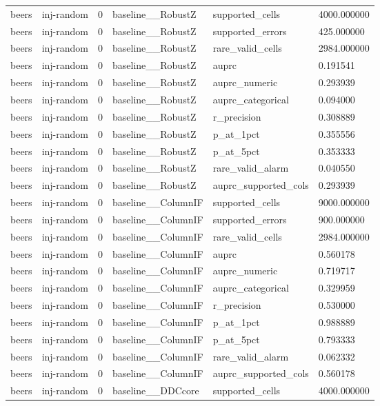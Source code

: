 \begin{tabular}{llllll}
beers & inj-random & 0 & baseline\_\_RobustZ & supported\_cells & 4000.000000 \\
beers & inj-random & 0 & baseline\_\_RobustZ & supported\_errors & 425.000000 \\
beers & inj-random & 0 & baseline\_\_RobustZ & rare\_valid\_cells & 2984.000000 \\
beers & inj-random & 0 & baseline\_\_RobustZ & auprc & 0.191541 \\
beers & inj-random & 0 & baseline\_\_RobustZ & auprc\_numeric & 0.293939 \\
beers & inj-random & 0 & baseline\_\_RobustZ & auprc\_categorical & 0.094000 \\
beers & inj-random & 0 & baseline\_\_RobustZ & r\_precision & 0.308889 \\
beers & inj-random & 0 & baseline\_\_RobustZ & p\_at\_1pct & 0.355556 \\
beers & inj-random & 0 & baseline\_\_RobustZ & p\_at\_5pct & 0.353333 \\
beers & inj-random & 0 & baseline\_\_RobustZ & rare\_valid\_alarm & 0.040550 \\
beers & inj-random & 0 & baseline\_\_RobustZ & auprc\_supported\_cols & 0.293939 \\
beers & inj-random & 0 & baseline\_\_ColumnIF & supported\_cells & 9000.000000 \\
beers & inj-random & 0 & baseline\_\_ColumnIF & supported\_errors & 900.000000 \\
beers & inj-random & 0 & baseline\_\_ColumnIF & rare\_valid\_cells & 2984.000000 \\
beers & inj-random & 0 & baseline\_\_ColumnIF & auprc & 0.560178 \\
beers & inj-random & 0 & baseline\_\_ColumnIF & auprc\_numeric & 0.719717 \\
beers & inj-random & 0 & baseline\_\_ColumnIF & auprc\_categorical & 0.329959 \\
beers & inj-random & 0 & baseline\_\_ColumnIF & r\_precision & 0.530000 \\
beers & inj-random & 0 & baseline\_\_ColumnIF & p\_at\_1pct & 0.988889 \\
beers & inj-random & 0 & baseline\_\_ColumnIF & p\_at\_5pct & 0.793333 \\
beers & inj-random & 0 & baseline\_\_ColumnIF & rare\_valid\_alarm & 0.062332 \\
beers & inj-random & 0 & baseline\_\_ColumnIF & auprc\_supported\_cols & 0.560178 \\
beers & inj-random & 0 & baseline\_\_DDCcore & supported\_cells & 4000.000000 \\

\end{tabular}
